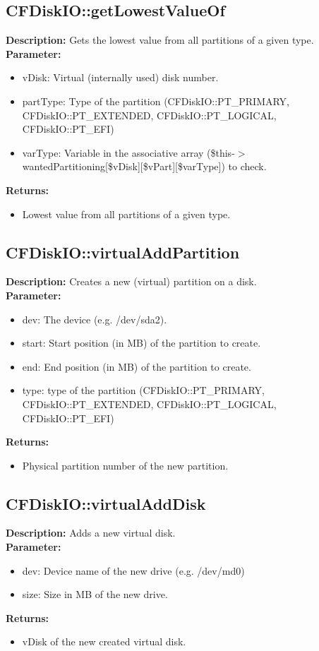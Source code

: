 \subsection{CFDiskIO::getLowestValueOf}
\textbf{Description:} Gets the lowest value from all partitions of a given type.\\
\textbf{Parameter:}
\begin{itemize}
\item vDisk: Virtual (internally used) disk number.
\item partType: Type of the partition (CFDiskIO::PT\_PRIMARY, CFDiskIO::PT\_EXTENDED, CFDiskIO::PT\_LOGICAL, CFDiskIO::PT\_EFI)
\item varType: Variable in the associative array (\$this-$>$wantedPartitioning[\$vDisk][\$vPart][\$varType]) to check.
\end{itemize}
\textbf{Returns:}
\begin{itemize}
\item Lowest value from all partitions of a given type.
\end{itemize}

\subsection{CFDiskIO::virtualAddPartition}
\textbf{Description:} Creates a new (virtual) partition on a disk.\\
\textbf{Parameter:}
\begin{itemize}
\item dev: The device (e.g. /dev/sda2).
\item start: Start position (in MB) of the partition to create.
\item end: End position (in MB) of the partition to create.
\item type: type of the partition (CFDiskIO::PT\_PRIMARY, CFDiskIO::PT\_EXTENDED, CFDiskIO::PT\_LOGICAL, CFDiskIO::PT\_EFI)
\end{itemize}
\textbf{Returns:}
\begin{itemize}
\item Physical partition number of the new partition.
\end{itemize}

\subsection{CFDiskIO::virtualAddDisk}
\textbf{Description:} Adds a new virtual disk.\\
\textbf{Parameter:}
\begin{itemize}
\item dev: Device name of the new drive (e.g. /dev/md0)
\item size: Size in MB of the new drive.
\end{itemize}
\textbf{Returns:}
\begin{itemize}
\item vDisk of the new created virtual disk.
\end{itemize}

